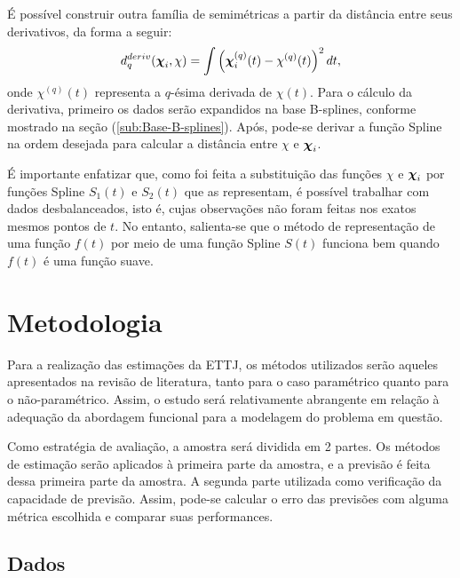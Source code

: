 \documentclass[
	12pt,				%
	openright,			%
	oneside,			%
	a4paper,			%
	english,			%
	brazil				%
	]{dissertacao-ufrgs-abntex2}
\begin{document}
É possível construir outra família de semimétricas a partir da distância
entre seus derivativos, da forma a seguir:
\begin{equation}
d_{q}^{deriv}(\boldsymbol{\chi}_{i},\chi)=\int\left(\boldsymbol{\chi}_{i}^{(q)}(t)-\chi^{(q)}(t)\right)^{2}dt,
\end{equation}
onde $\chi^{(q)}(t)$ representa a $q$-ésima derivada de $\chi(t)$.
Para o cálculo da derivativa, primeiro os dados serão expandidos na
base B-splines, conforme mostrado na seção (\ref{sub:Base-B-splines}).
Após, pode-se derivar a função Spline na ordem desejada para calcular
a distância entre $\chi$ e $\boldsymbol{\chi}_{i}$.

É importante enfatizar que, como foi feita a substituição das funções
$\chi$ e $\boldsymbol{\chi}_{i}$ por funções Spline $S_{1}(t)$ e $S_{2}(t)$
que as representam, é possível trabalhar com dados desbalanceados,
isto é, cujas observações não foram feitas nos exatos mesmos pontos
de $t$. No entanto, salienta-se que o método de representação de
uma função $f(t)$ por meio de uma função Spline $S(t)$ funciona
bem quando $f(t)$ é uma função suave.



\chapter{Metodologia} \label{ch:metodologia}

Para a realização das estimações da ETTJ, os métodos utilizados serão aqueles apresentados na revisão de literatura, tanto para o caso paramétrico quanto para o não-paramétrico. Assim, o estudo será relativamente abrangente em relação à adequação da abordagem funcional para a modelagem do problema em questão.

Como estratégia de avaliação, a amostra será dividida em 2 partes. Os métodos de estimação serão aplicados à primeira parte da amostra, e a previsão é feita dessa primeira parte da amostra. A segunda parte utilizada como verificação da capacidade de previsão. Assim, pode-se calcular o erro das previsões com alguma métrica escolhida e comparar suas performances. 

\section{Dados}
\end{document}
